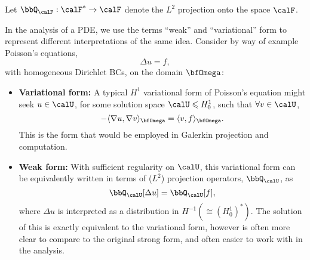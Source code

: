     Let $\bbQ_{\calF} : \calF^{*} \rightarrow \calF$ denote the $L^{2}$ projection onto the space $\calF$.

    In the analysis of a PDE, we use the terms ``weak'' and ``variational'' form to represent different interpretations of the same idea. Consider by way of example Poisson's equations,
    \begin{equation}
        \Delta u  =  f,
    \end{equation}
    with homogeneous Dirichlet BCs, on the domain $\bfOmega$:
    \begin{itemize}
        \item  {\bf Variational form:} A typical $H^{1}$ variational form of Poisson's equation might seek $u \in \calU$, for some solution space $\calU \leqslant H^{1}_{0}$, such that $\forall v \in \calU$,
        \begin{equation}
            - \langle\nabla u, \nabla v\rangle_{\bfOmega}  =  \langle v, f\rangle_{\bfOmega}.
        \end{equation}
        This is the form that would be employed in Galerkin projection and computation.
        \item  {\bf Weak form:} With sufficient regularity on $\calU$, this variational form can be equivalently written in terms of ($L^{2}$) projection operators, $\bbQ_{\calU}$, as
        \begin{equation}
            \bbQ_{\calU}[\Delta u]  =  \bbQ_{\calU}[f],
        \end{equation}
        where $\Delta u$ is interpreted as a distribution in $H^{- 1} (\cong (H^{1}_{0})^{*})$. The solution of this is exactly equivalent to the variational form, however is often more clear to compare to the original strong form, and often easier to work with in the analysis.
    \end{itemize}
    
